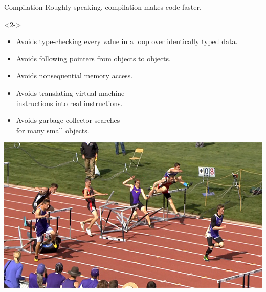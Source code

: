\documentclass[aspectratio=169]{beamer}
\begin{document}
\begin{frame}{Compilation}
\Large
\vspace{0.5 cm}
Roughly speaking, compilation makes code faster.

\vspace{0.5 cm}
\large

\vspace{0.5 cm}
\begin{uncoverenv}<2->
\hfill\begin{minipage}{0.97\linewidth}
\begin{itemize}
\item Avoids type-checking every value in a loop over identically typed data.
\item Avoids following pointers from objects to objects.
\item Avoids nonsequential memory access.
\item Avoids translating virtual machine \\ instructions into real instructions.
\item Avoids garbage collector searches \\ for many small objects.
\end{itemize}
\end{minipage}

\vspace{-2.5 cm}
\hfill \includegraphics[width=5.5 cm]{hurdle9.jpg}
\end{uncoverenv}
\end{frame}
\end{document}

